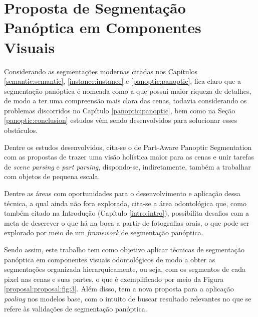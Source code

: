 \newpage
\clearpage

\section{Proposta de Segmentação Panóptica em Componentes Visuais}
\label{proposal:proposal}

Considerando as segmentações modernas citadas nos Capítulos \ref{semantic:semantic}, \ref{instance:instance} e \ref{panoptic:panoptic}, fica claro que a segmentação panóptica é nomeada como a que possui maior riqueza de detalhes, de modo a ter uma compreensão mais clara das cenas, todavia considerando os problemas discorridos no Capítulo \ref{panoptic:panoptic}, bem como na Seção \ref{panoptic:conclusion} estudos vêm sendo desenvolvidos para solucionar esses obstáculos.

\begin{sloppypar}
Dentre os estudos desenvolvidos, cita-se o de Part-Aware Panoptic Segmentation \cite{DeGeus2021} com as propostas de trazer uma visão holística maior para as cenas e unir tarefas de \textit{scene parsing} e \textit{part parsing}, dispondo-se, indiretamente, também a trabalhar com objetos de pequena escala.
\end{sloppypar}

Dentre as áreas com oportunidades para o desenvolvimento e aplicação dessa técnica, a qual ainda não fora explorada, cita-se a área odontológica que, como também citado na Introdução (Capítulo \ref{intro:intro}), possibilita desafios com a meta de descrever o que há na boca a partir de fotografias orais, o que pode ser explorado por meio de um \textit{framework} de segmentação panóptica.

Sendo assim, este trabalho tem como objetivo aplicar técnicas de segmentação panóptica em componentes visuais odontológicos de modo a obter as segmentações organizada hierarquicamente, ou seja, com os segmentos de cada pixel nas cenas e suas partes, o que é exemplificado por meio da Figura \ref{proposal:proposal:fig:3}. Além disso, tem a nova proposta para a aplicação \textit{pooling} nos modelos base, com o intuito de buscar resultado relevantes no que se refere às validações de segmentação panóptica.

